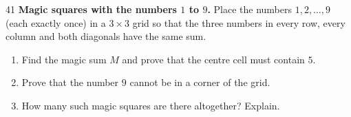 \begin{probbox}{41}{}
\textbf{Magic squares with the numbers $1$ to $9$.} Place the numbers $1, 2, \dots, 9$ (each exactly once) in a $3\times 3$ grid so that
the three numbers in every row, every column and both diagonals have the same sum.
\begin{enumerate}[label=\alph*),leftmargin=1.6em,itemsep=1pt,topsep=2pt]
  \item Find the magic sum $M$ and prove that the centre cell must contain $5$.
  \item Prove that the number $9$ cannot be in a corner of the grid.
  \item How many such magic squares are there altogether? Explain.
\end{enumerate}
\end{probbox}
